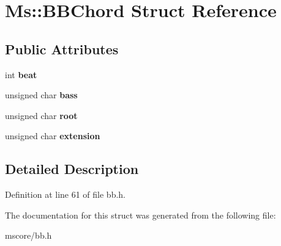 \hypertarget{struct_ms_1_1_b_b_chord}{}\section{Ms\+:\+:B\+B\+Chord Struct Reference}
\label{struct_ms_1_1_b_b_chord}
\subsection*{Public Attributes}
\begin{DoxyCompactItemize}
\item 
\mbox{\label{struct_ms_1_1_b_b_chord_ab6a99bb7cfcc81230834aa680848e850}} 
int {\bfseries beat}
\item 
\mbox{\label{struct_ms_1_1_b_b_chord_acdba98b6d558b7758791fcea41cd66ec}} 
unsigned char {\bfseries bass}
\item 
\mbox{\label{struct_ms_1_1_b_b_chord_ac5d47eb034317d37e3ebe22a9ce2a09e}} 
unsigned char {\bfseries root}
\item 
\mbox{\label{struct_ms_1_1_b_b_chord_a8ce8eda7443ac1a3cdae9b48cfafcf75}} 
unsigned char {\bfseries extension}
\end{DoxyCompactItemize}


\subsection{Detailed Description}


Definition at line 61 of file bb.\+h.



The documentation for this struct was generated from the following file\+:\begin{DoxyCompactItemize}
\item 
mscore/bb.\+h\end{DoxyCompactItemize}
